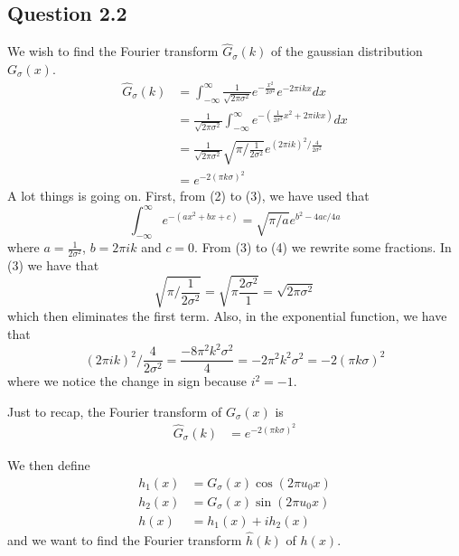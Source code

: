 \documentclass[a4paper, 10pt, final]{article}
\begin{document}
\subsection*{Question 2.2}
We wish to find the Fourier transform $\hat{G}_{\sigma}(k)$ of the
gaussian distribution $G_{\sigma}(x)$.
\begin{align}
    \hat{G}_{\sigma}(k) & = \int_{-\infty}^{\infty}{\frac{1}{\sqrt{2\pi \sigma^{2}}}e^{-\frac{x^2}{2\sigma^2}}e^{-2\pi ikx}dx}\\
    & = \frac{1}{\sqrt{2\pi \sigma^{2}}}\int_{-\infty}^{\infty}{e^{-(\frac{1}{2\sigma^2}x^2 + 2\pi ikx)}dx}\\
    & = \frac{1}{\sqrt{2\pi
    \sigma^{2}}}\sqrt{\pi/\frac{1}{2\sigma^{2}}}e^{(2\pi ik)^2/\frac{4}{2\sigma^2}}\\
    & = e^{-2(\pi k\sigma)^2}
\end{align}
A lot things is going on. First, from (2) to (3), we have used that
\begin{equation}
    \int_{-\infty}^{\infty}e^{-(ax^2+bx+c)} = \sqrt{\pi/a}e^{b^2 - 4ac/4a}
\end{equation}
where $a = \frac{1}{2\sigma^2}$, $b = 2\pi ik$ and $c = 0$. From
(3) to (4) we rewrite some fractions. In (3) we have that
\begin{equation}
    \sqrt{\pi/\frac{1}{2\sigma^{2}}} =
    \sqrt{\pi\frac{2\sigma^2}{1}} = \sqrt{2\pi\sigma^2}
\end{equation}
which then eliminates the first term. Also, in the exponential function,
we have that
\begin{equation}
    (2\pi ik)^2 / \frac{4}{2\sigma^2} = \frac{-8\pi^{2}k^{2}\sigma^2}{4}
    = -2\pi^2 k^2\sigma^2 = -2(\pi k \sigma)^2
\end{equation}
where we notice the change in sign because $i^2 = -1$.

Just to recap, the Fourier transform of $G_{\sigma}(x)$ is
\begin{align}
    \hat{G}_{\sigma}(k) & = e^{-2(\pi k\sigma)^2}
\end{align}

We then define
\begin{align}
    h_1(x) & = G_{\sigma}(x)\cos(2\pi u_0x)\\
    h_2(x) & = G_{\sigma}(x)\sin(2\pi u_0x)\\
    h(x) & = h_1(x) + ih_2(x)
\end{align}
and we want to find the Fourier transform $\hat{h}(k)$ of $h(x)$.
\end{document}
